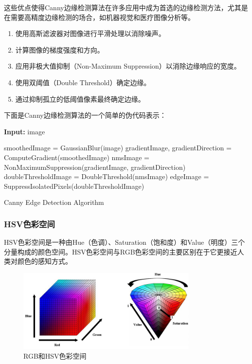 \documentclass[10pt]{ctexart}
\begin{document}
这些优点使得Canny边缘检测算法在许多应用中成为首选的边缘检测方法，尤其是在需要高精度边缘检测的场合，如机器视觉和医疗图像分析等。

\begin{enumerate}
    \item 使用高斯滤波器对图像进行平滑处理以消除噪声。
    \item 计算图像的梯度强度和方向。
    \item 应用非极大值抑制（Non-Maximum Suppression）以消除边缘响应的宽度。
    \item 使用双阈值（Double Threshold）确定边缘。
    \item 通过抑制孤立的低阈值像素最终确定边缘。
\end{enumerate}

下面是Canny边缘检测算法的一个简单的伪代码表示：

\begin{center}
    \begin{minipage}{0.7\textwidth}
        \begin{algorithm}[H]
            \SetAlgoLined
            \textbf{Input:} {image}

            smoothedImage = GaussianBlur(image)\;
            gradientImage, gradientDirection = ComputeGradient(smoothedImage)\;
            nmsImage = NonMaximumSuppression(gradientImage, gradientDirection)\;
            doubleThresholdImage = DoubleThreshold(nmsImage)\;
            edgeImage = SuppressIsolatedPixels(doubleThresholdImage)\;
            \;

            \caption{Canny Edge Detection Algorithm}
        \end{algorithm}
    \end{minipage}
\end{center}




\subsubsection{HSV色彩空间}
HSV色彩空间是一种由Hue（色调）、Saturation（饱和度）和Value（明度）三个分量构成的颜色空间。HSV色彩空间与RGB色彩空间的主要区别在于它更接近人类对颜色的感知方式。
\begin{figure}[H]
    \centering
    \includegraphics[width = 0.8\textwidth]{algo/RGB_HSV.jpg}
    \caption{RGB和HSV色彩空间}
    \label{fig:HSV}
\end{figure}
\end{document}
